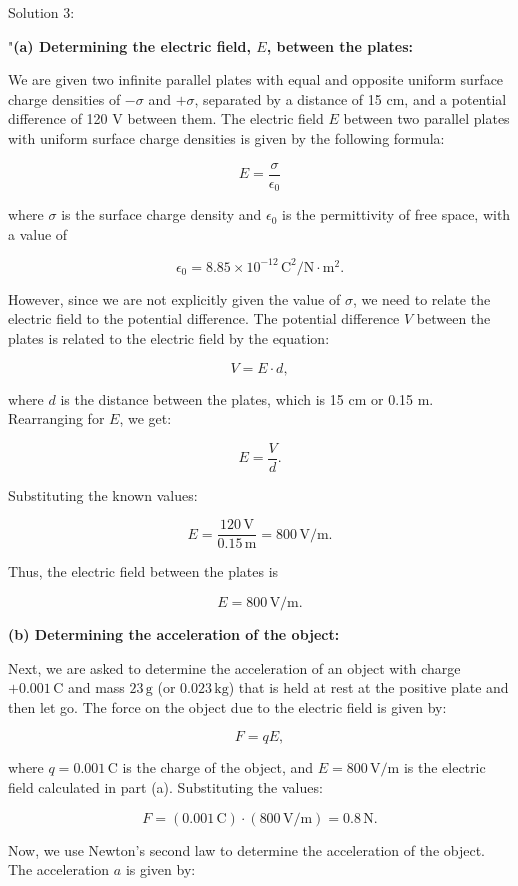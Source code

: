 Solution 3:

"\textbf{(a) Determining the electric field, $E$, between the plates:}

We are given two infinite parallel plates with equal and opposite uniform surface charge densities of $-\sigma$ and $+\sigma$, separated by a distance of 15 cm, and a potential difference of 120 V between them. The electric field $E$ between two parallel plates with uniform surface charge densities is given by the following formula:

\[
E = \frac{\sigma}{\epsilon_0}
\]

where $\sigma$ is the surface charge density and $\epsilon_0$ is the permittivity of free space, with a value of

\[
\epsilon_0 = 8.85 \times 10^{-12} \, \text{C}^2/\text{N}\cdot\text{m}^2.
\]

However, since we are not explicitly given the value of $\sigma$, we need to relate the electric field to the potential difference. The potential difference $V$ between the plates is related to the electric field by the equation:

\[
V = E \cdot d,
\]

where $d$ is the distance between the plates, which is 15 cm or 0.15 m. Rearranging for $E$, we get:

\[
E = \frac{V}{d}.
\]

Substituting the known values:

\[
E = \frac{120 \, \text{V}}{0.15 \, \text{m}} = 800 \, \text{V/m}.
\]

Thus, the electric field between the plates is

\[
E = 800 \, \text{V/m}.
\]

\textbf{(b) Determining the acceleration of the object:}

Next, we are asked to determine the acceleration of an object with charge $+0.001 \, \text{C}$ and mass $23 \, \text{g}$ (or $0.023 \, \text{kg}$) that is held at rest at the positive plate and then let go. The force on the object due to the electric field is given by:

\[
F = qE,
\]

where $q = 0.001 \, \text{C}$ is the charge of the object, and $E = 800 \, \text{V/m}$ is the electric field calculated in part (a). Substituting the values:

\[
F = (0.001 \, \text{C}) \cdot (800 \, \text{V/m}) = 0.8 \, \text{N}.
\]

Now, we use Newton's second law to determine the acceleration of the object. The acceleration $a$ is given by:

